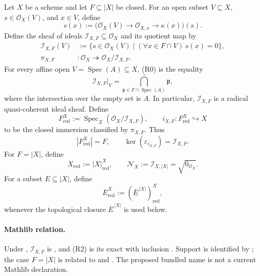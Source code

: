 \begin{definition}
  \label{def:nagata-reduced-closed-subscheme}

  Let $X$ be a scheme and let $F\subseteq |X|$ be closed.  For an open
  subset $V\subseteq X$, $s\in\mathcal O_X(V)$, and $x\in V$, define
  \[
    s(x):=\bigl(\mathcal O_X(V)\longrightarrow
      \mathcal O_{X,x}\longrightarrow\kappa(x)\bigr)(s).
  \]
  Define the sheaf of ideals $\mathcal I_{X,F}\subseteq\mathcal O_X$ and
  its quotient map by
  \[
  \begin{aligned}
    \mathcal I_{X,F}(V)
      &:=\{s\in\mathcal O_X(V)\mid
          (\forall x\in F\cap V)\ s(x)=0\},\\
    \pi_{X,F}&\colon\mathcal O_X\twoheadrightarrow
      \mathcal O_X/\mathcal I_{X,F}.
  \end{aligned}                                                     \tag{R0}
  \]
  For every affine open $V=\operatorname{Spec}(A)\subseteq X$, (R0) is
  the equality
  \[
    \mathcal I_{X,F}|_V
      =\widetilde{\bigcap_{\mathfrak p\in F\cap\operatorname{Spec}(A)}
          \mathfrak p},                                           \tag{R1}
  \]
  where the intersection over the empty set is $A$.  In particular,
  $\mathcal I_{X,F}$ is a radical quasi-coherent ideal sheaf.  Define
  \[
    F_{\mathrm{red}}^X
      :=\operatorname{Spec}_X(\mathcal O_X/\mathcal I_{X,F}),
    \qquad
    i_{X,F}\colon F_{\mathrm{red}}^X\hookrightarrow X              \tag{R2}
  \]
  to be the closed immersion classified by $\pi_{X,F}$.  Thus
  \[
    |F_{\mathrm{red}}^X|=F,
    \qquad
    \ker(\varepsilon_{i_{X,F}})=\mathcal I_{X,F}.
  \]
  For $F=|X|$, define
  \[
    X_{\mathrm{red}}:=|X|_{\mathrm{red}}^X,
    \qquad
    \mathcal N_X:=\mathcal I_{X,|X|}=\sqrt{0_{\mathcal O_X}}.
  \]
  For a subset $E\subseteq|X|$, define
  \[
    \overline E_{\mathrm{red}}^X
      :=(\overline E^{\,|X|})_{\mathrm{red}}^X,
  \]
  whenever the topological closure $\overline E^{\,|X|}$ is used below.

  \paragraph{Mathlib relation.}
  Under ,
  $\mathcal I_{X,F}$ is
  \texttt{}, and (R2) is
  its exact \texttt{} with inclusion
  \texttt{}.  Support is identified by
  \texttt{}; the case
  $F=|X|$ is related to \texttt{} and
  \texttt{}.  The proposed
  bundled name \texttt{}
  is not a current Mathlib declaration.
\end{definition}


